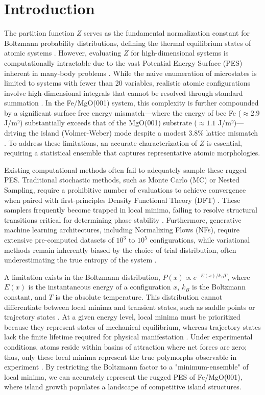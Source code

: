 \section{Introduction}
The partition function $Z$ serves as the fundamental normalization constant for Boltzmann probability distributions, defining the thermal equilibrium states of atomic systems \cite{Kou2006}. However, evaluating $Z$ for high-dimensional systems is computationally intractable due to the vast Potential Energy Surface (PES) inherent in many-body problems \cite{Wang2024}. While the naive enumeration of microstates is limited to systems with fewer than 20 variables, realistic atomic configurations involve high-dimensional integrals that cannot be resolved through standard summation \cite{Christiansen2023}. In the Fe/MgO(001) system, this complexity is further compounded by a significant surface free energy mismatch—where the energy of bcc Fe ($\approx 2.9$ J/m²) substantially exceeds that of the MgO(001) substrate ($\approx 1.1$ J/m²)—driving the island (Volmer-Weber) mode despite a modest 3.8\% lattice mismatch \cite{Wisnios2015, Yuasa2004}. To address these limitations, an accurate characterization of $Z$ is essential, requiring a statistical ensemble that captures representative atomic morphologies.

Existing computational methods often fail to adequately sample these rugged PES. Traditional stochastic methods, such as Monte Carlo (MC) or Nested Sampling, require a prohibitive number of evaluations to achieve convergence when paired with first-principles Density Functional Theory (DFT) \cite{Hamamoto2023}. These samplers frequently become trapped in local minima, failing to resolve structural transitions critical for determining phase stability \cite{Noe2019}. Furthermore, generative machine learning architectures, including Normalizing Flows (NFs)\cite{papamakarios2021}, require extensive pre-computed datasets of $10^{3}$ to $10^{5}$ configurations, while variational methods remain inherently biased by the choice of trial distribution, often underestimating the true entropy of the system \cite{Paleico2020, Mehta2018}.

A limitation exists in the Boltzmann distribution, $P(x) \propto e^{-E(x)/k_{B} T}$, where $E(x)$ is the instantaneous energy of a configuration $x$, $k_{B}$ is the Boltzmann constant, and $T$ is the absolute temperature. This distribution cannot differentiate between local minima and transient states, such as saddle points or trajectory states \cite{david2017, angelani2002}. At a given energy level, local minima must be prioritized because they represent states of mechanical equilibrium, whereas trajectory states lack the finite lifetime required for physical manifestation \cite{somani2013, asenjo2013}. Under experimental conditions, atoms reside within basins of attraction where net forces are zero; thus, only these local minima represent the true polymorphs observable in experiment \cite{wales2006}. By restricting the Boltzmann factor to a "minimum-ensemble" of local minima, we can accurately represent the rugged PES of Fe/MgO(001), where island growth populates a landscape of competitive island structures.

